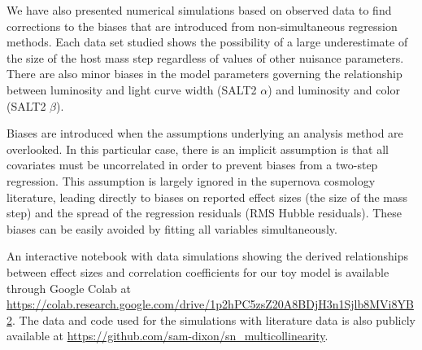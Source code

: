 We have also presented numerical simulations based on observed data to find corrections to the biases that are introduced from non-simultaneous regression methods. Each data set studied shows the possibility of a large underestimate of the size of the host mass step regardless of values of other nuisance parameters. There are also minor biases in the model parameters governing the relationship between luminosity and light curve width (SALT2 $\alpha$) and luminosity and color (SALT2 $\beta$).

Biases are introduced when the assumptions underlying an analysis method are overlooked. In this particular case, there is an implicit assumption is that all covariates must be uncorrelated in order to prevent biases from a two-step regression. This assumption is largely ignored in the supernova cosmology literature, leading directly to biases on reported effect sizes (the size of the mass step) and the spread of the regression residuals (RMS Hubble residuals). These biases can be easily avoided by fitting all variables simultaneously.

An interactive notebook with data simulations showing the derived relationships between effect sizes and correlation coefficients for our toy model is available through Google Colab at \url{https://colab.research.google.com/drive/1p2hPC5zsZ20A8BDjH3n1Sjlb8MVi8YB2}. The data and code used for the simulations with literature data is also publicly available at \url{https://github.com/sam-dixon/sn_multicollinearity}.
